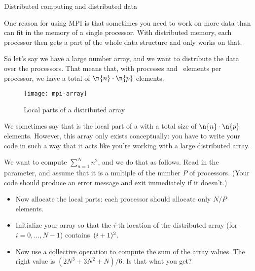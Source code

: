 
 {Distributed computing and distributed data}

One reason for using MPI is that sometimes you need to work on
more data than can fit in the memory of a single processor.
With distributed memory, each processor then gets a part
of the whole data structure and only works on that.

So let's say we have a large number array, and we want to
distribute the data over the processors.
That means that, with  processes and ~elements
per processor, we have a total of $\n{n}\cdot\n{p}$ elements.

\begin{figure}[ht]
  \texttt{[image: mpi-array]}
  \caption{Local parts of a distributed array}
  \label{fig:mpi-array}
\end{figure}

We sometimes say that  is the local part
of a  with a total size of
$\n{n}\cdot\n{p}$ elements.
However, this array only exists
conceptually: you have to write your code in such a way that
it acts like you're working with a large distributed array.

\begin{exercise}
  We want to compute $\sum_{n=1}^Nn^2$, and we do that as follows.
  Read in the  parameter, and assume that it is a multiple
  of the number $P$ of processors. (Your code should produce an error message and
  exit immediately if it doesn't.)

  \begin{itemize}
  \item Now allocate the local parts: each processor should allocate only $N/P$ elements.
  \item Initialize your array so that the $i$-th location of the distributed array
    (for $i=0,\ldots,N-1$)
    contains~$(i+\nobreak 1)^2$.
  \item Now use a collective operation to compute the sum of the array values.
    The right value is $(2N^3+3N^2+N)/6$. Is that what you get?
  \end{itemize}
\end{exercise}

